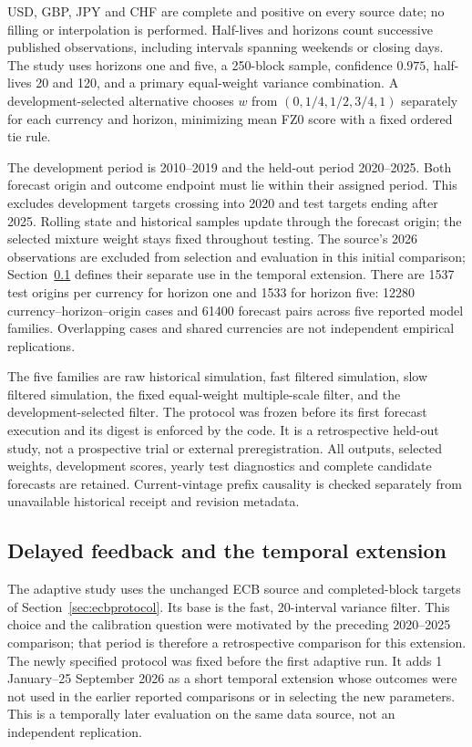 \documentclass[11pt,a4paper]{article}
\theoremstyle{definition}\newtheorem{definition}[theorem]{Definition}
\begin{document}
USD, GBP, JPY and CHF are complete and positive on every source date; no filling or interpolation is performed. Half-lives and horizons count successive published observations, including intervals spanning weekends or closing days. The study uses horizons one and five, a 250-block sample, confidence $0.975$, half-lives 20 and 120, and a primary equal-weight variance combination. A development-selected alternative chooses $w$ from $(0,1/4,1/2,3/4,1)$ separately for each currency and horizon, minimizing mean FZ0 score with a fixed ordered tie rule.

The development period is 2010--2019 and the held-out period 2020--2025. Both forecast origin and outcome endpoint must lie within their assigned period. This excludes development targets crossing into 2020 and test targets ending after 2025. Rolling state and historical samples update through the forecast origin; the selected mixture weight stays fixed throughout testing. The source's 2026 observations are excluded from selection and evaluation in this initial comparison; Section~\ref{sec:adaptiveprotocol} defines their separate use in the temporal extension. There are 1537 test origins per currency for horizon one and 1533 for horizon five: 12280 currency--horizon--origin cases and 61400 forecast pairs across five reported model families. Overlapping cases and shared currencies are not independent empirical replications.

The five families are raw historical simulation, fast filtered simulation, slow filtered simulation, the fixed equal-weight multiple-scale filter, and the development-selected filter. The protocol was frozen before its first forecast execution and its digest is enforced by the code. It is a retrospective held-out study, not a prospective trial or external preregistration. All outputs, selected weights, development scores, yearly test diagnostics and complete candidate forecasts are retained. Current-vintage prefix causality is checked separately from unavailable historical receipt and revision metadata.


\subsection{Delayed feedback and the temporal extension}\label{sec:adaptiveprotocol}
The adaptive study uses the unchanged ECB source and completed-block targets of Section~\ref{sec:ecbprotocol}. Its base is the fast, 20-interval variance filter. This choice and the calibration question were motivated by the preceding 2020--2025 comparison; that period is therefore a retrospective comparison for this extension. The newly specified protocol was fixed before the first adaptive run. It adds 1 January--25 September 2026 as a short temporal extension whose outcomes were not used in the earlier reported comparisons or in selecting the new parameters. This is a temporally later evaluation on the same data source, not an independent replication.
\end{document}
